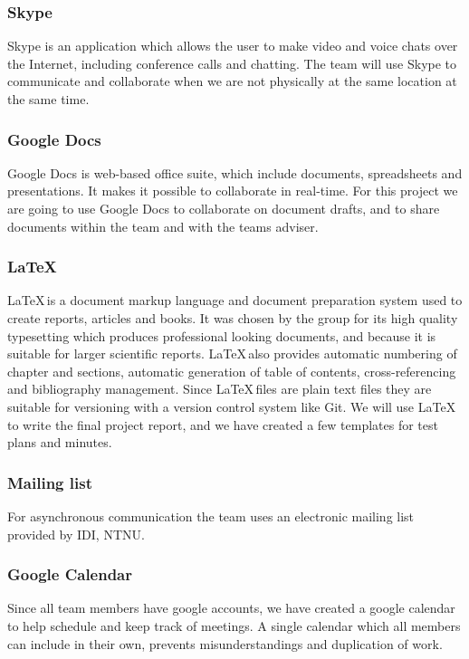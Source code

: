 \subsubsection{Skype}
Skype is an application which allows the user to make video and voice chats
over the Internet, including conference calls and chatting. The team will use
Skype to communicate and collaborate when we are not physically at the same
location at the same time.

\subsubsection{Google Docs}
Google Docs is web-based office suite, which include documents, spreadsheets
and presentations. It makes it possible to collaborate in real-time. For this
project we are going to use Google Docs to collaborate on document drafts,
and to share documents within the team and with the teams adviser.

\subsubsection{\LaTeX}
\LaTeX \,is a document markup language and document preparation system used to
create reports, articles and books. It was chosen by the group for its 
high quality typesetting which produces professional looking documents, and 
because it is suitable for larger scientific reports. \LaTeX \,also provides
automatic numbering of chapter and sections, automatic generation of table of
contents, cross-referencing and bibliography management. Since \LaTeX \,files
are plain text files they are suitable for versioning with a version control
system like Git. We will use \LaTeX \,to write the final project report, and we
have created a few templates for test plans and minutes.

\subsubsection{Mailing list}
For asynchronous communication the team uses an electronic mailing list
provided by IDI, NTNU.

\subsubsection{Google Calendar}
Since all team members have google accounts, we have created a google calendar
to help schedule and keep track of meetings. A single calendar which all
members can include in their own, prevents misunderstandings and duplication
of work.

